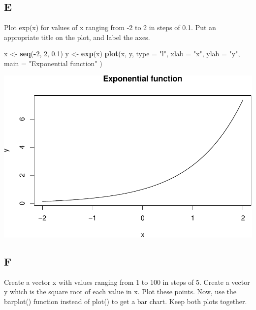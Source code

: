 \documentclass[
]{article}
\newenvironment{Shaded}{\begin{snugshade}}{\end{snugshade}}
\newcommand{\AttributeTok}[1]{\textcolor[rgb]{0.13,0.29,0.53}{#1}}
\newcommand{\DecValTok}[1]{\textcolor[rgb]{0.00,0.00,0.81}{#1}}
\newcommand{\FloatTok}[1]{\textcolor[rgb]{0.00,0.00,0.81}{#1}}
\newcommand{\FunctionTok}[1]{\textcolor[rgb]{0.13,0.29,0.53}{\textbf{#1}}}
\newcommand{\NormalTok}[1]{#1}
\newcommand{\OtherTok}[1]{\textcolor[rgb]{0.56,0.35,0.01}{#1}}
\newcommand{\SpecialCharTok}[1]{\textcolor[rgb]{0.81,0.36,0.00}{\textbf{#1}}}
\newcommand{\StringTok}[1]{\textcolor[rgb]{0.31,0.60,0.02}{#1}}
\begin{document}
\hypertarget{e}{%
\subsection{E}\label{e}}

Plot exp(x) for values of x ranging from -2 to 2 in steps of 0.1. Put an
appropriate title on the plot, and label the axes.

\begin{Shaded}
\begin{Highlighting}[]
\NormalTok{x }\OtherTok{\textless{}{-}} \FunctionTok{seq}\NormalTok{(}\SpecialCharTok{{-}}\DecValTok{2}\NormalTok{, }\DecValTok{2}\NormalTok{, }\FloatTok{0.1}\NormalTok{)}
\NormalTok{y }\OtherTok{\textless{}{-}} \FunctionTok{exp}\NormalTok{(x)}
\FunctionTok{plot}\NormalTok{(x, y,}
  \AttributeTok{type =} \StringTok{"l"}\NormalTok{,}
  \AttributeTok{xlab =} \StringTok{"x"}\NormalTok{,}
  \AttributeTok{ylab =} \StringTok{"y"}\NormalTok{,}
  \AttributeTok{main =} \StringTok{"Exponential function"}
\NormalTok{)}
\end{Highlighting}
\end{Shaded}

\includegraphics{es2_files/figure-latex/unnamed-chunk-5-1.pdf}

\hypertarget{f}{%
\subsection{F}\label{f}}

Create a vector x with values ranging from 1 to 100 in steps of 5.
Create a vector y which is the square root of each value in x. Plot
these points. Now, use the barplot() function instead of plot() to get a
bar chart. Keep both plots together.
\end{document}
